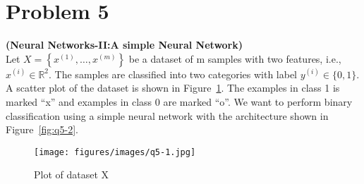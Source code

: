 \section*{Problem 5}

\textbf{(Neural Networks-II:\@ A simple Neural Network)}\\
Let \( X=\left \{x^{(1)}, \ldots, x^{(m)}\right \} \) be a dataset of m samples with two features, i.e., \( x^{(i)} \in \mathbb{R}^{2} \).
The samples are classified into two categories with label \( y^{(i)} \in \{0,1\} \).
A scatter plot of the dataset is shown in Figure~\ref{fig:q5-1}.
The examples in class 1 is marked ``x'' and examples in class 0 are marked ``o''.
We want to perform binary classification using a simple neural network with the architecture shown in Figure~\ref{fig:q5-2}.

\begin{figure}[htb]
    \centering
    \texttt{[image: figures/images/q5-1.jpg]}
    \caption{
        Plot of dataset X
    }\label{fig:q5-1}
\end{figure}

